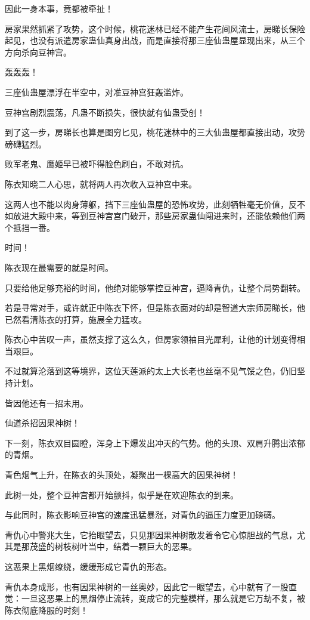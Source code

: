 \begin{this_body}
因此一身本事，竟都被牵扯！

房家果然抓紧了攻势，这个时候，桃花迷林已经不能产生花间风流士，房睇长保险起见，也没有派遣房家蛊仙真身出战，而是直接将那三座仙蛊屋显现出来，从三个方向杀向豆神宫。

轰轰轰！

三座仙蛊屋漂浮在半空中，对准豆神宫狂轰滥炸。

豆神宫剧烈震荡，凡蛊不断损失，很快就有仙蛊受创！

到了这一步，房睇长也算是图穷匕见，桃花迷林中的三大仙蛊屋都直接出动，攻势磅礴猛烈。

败军老鬼、鹰姬早已被吓得脸色刷白，不敢对抗。

陈衣知晓二人心思，就将两人再次收入豆神宫中来。

这两人也不能以肉身薄躯，挡下三座仙蛊屋的恐怖攻势，此刻牺牲毫无价值，反不如放进大殿中来，等到豆神宫宫门破开，那些房家蛊仙闯进来时，还能依赖他们两个抵挡一番。

时间！

陈衣现在最需要的就是时间。

只要给他足够充裕的时间，他绝对能够掌控豆神宫，逼降青仇，让整个局势翻转。

若是寻常对手，或许就正中陈衣下怀，但是陈衣面对的却是智道大宗师房睇长，他已然看清陈衣的打算，施展全力猛攻。

陈衣心中苦叹一声，虽然支撑了这么久，但房家领袖目光犀利，让他的计划变得相当艰巨。

不过就算沦落到这等境界，这位天莲派的太上大长老也丝毫不见气馁之色，仍旧坚持计划。

皆因他还有一招未用。

仙道杀招因果神树！

下一刻，陈衣双目圆瞪，浑身上下爆发出冲天的气势。他的头顶、双肩升腾出浓郁的青烟。

青色烟气上升，在陈衣的头顶处，凝聚出一棵高大的因果神树！

此树一处，整个豆神宫都开始颤抖，似乎是在欢迎陈衣的到来。

与此同时，陈衣影响豆神宫的速度迅猛暴涨，对青仇的逼压力度更加磅礴。

青仇心中警兆大生，它抬眼望去，只见那因果神树散发着令它心惊胆战的气息，尤其是那茂盛的树枝树叶当中，结着一颗巨大的恶果。

这恶果上黑烟缭绕，缓缓形成它青仇的形态。

青仇本身成形，也有因果神树的一丝奥妙，因此它一眼望去，心中就有了一股直觉：一旦这恶果上的黑烟停止流转，变成它的完整模样，那么就是它万劫不复，被陈衣彻底降服的时刻！


\end{this_body}
